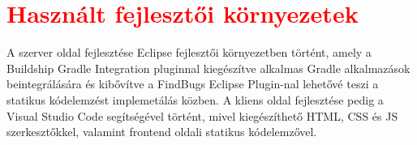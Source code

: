 \section{\textcolor{red}{Használt fejlesztői környezetek}}
\label{subsec:fejleszoiKornyezet}

A szerver oldal fejlesztése Eclipse \cite{Eclipse} fejlesztői környezetben történt, amely a Buildship Gradle Integration pluginnal \cite{GradlePlugin} kiegészítve alkalmas Gradle alkalmazások beintegrálására és kibővítve a FindBugs Eclipse Plugin-nal\cite{FindBugsEclipsePlugin} lehetővé teszi a statikus kódelemzést implemetálás közben. A kliens oldal fejlesztése pedig a Visual Studio Code \cite{VSCode} segítségével történt, mivel kiegészíthető HTML, CSS és JS szerkesztőkkel, valamint frontend oldali statikus kódelemzővel. 
